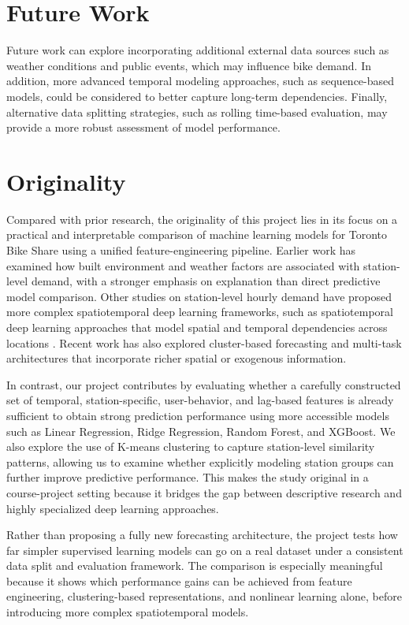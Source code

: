 \documentclass[11pt]{article}
\begin{document}
\section*{Future Work}

Future work can explore incorporating additional external data sources such as weather conditions and public events, which may influence bike demand. In addition, more advanced temporal modeling approaches, such as sequence-based models, could be considered to better capture long-term dependencies. Finally, alternative data splitting strategies, such as rolling time-based evaluation, may provide a more robust assessment of model performance.

\section*{Originality}
Compared with prior research, the originality of this project lies in its focus on a practical and interpretable comparison of machine learning models for Toronto Bike Share using a unified feature-engineering pipeline. Earlier work has examined how built environment and weather factors are associated with station-level demand, with a stronger emphasis on explanation than direct predictive model comparison. Other studies on station-level hourly demand have proposed more complex spatiotemporal deep learning frameworks, such as spatiotemporal deep learning approaches that model spatial and temporal dependencies across locations \cite{zhang2017deepst}. Recent work has also explored cluster-based forecasting and multi-task architectures that incorporate richer spatial or exogenous information.

In contrast, our project contributes by evaluating whether a carefully constructed set of temporal, station-specific, user-behavior, and lag-based features is already sufficient to obtain strong prediction performance using more accessible models such as Linear Regression, Ridge Regression, Random Forest, and XGBoost. We also explore the use of K-means clustering to capture station-level similarity patterns, allowing us to examine whether explicitly modeling station groups can further improve predictive performance. This makes the study original in a course-project setting because it bridges the gap between descriptive research and highly specialized deep learning approaches.

Rather than proposing a fully new forecasting architecture, the project tests how far simpler supervised learning models can go on a real dataset under a consistent data split and evaluation framework. The comparison is especially meaningful because it shows which performance gains can be achieved from feature engineering, clustering-based representations, and nonlinear learning alone, before introducing more complex spatiotemporal models.



\end{document}
